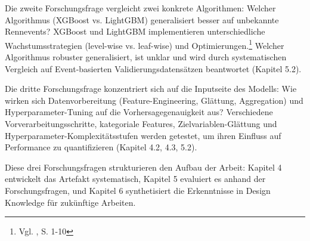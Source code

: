 Die zweite Forschungsfrage vergleicht zwei konkrete Algorithmen: Welcher Algorithmus (XGBoost vs. LightGBM) generalisiert besser auf unbekannte Rennevents? XGBoost und LightGBM implementieren unterschiedliche Wachstumsstrategien (level-wise vs. leaf-wise) und Optimierungen.\footnote{Vgl. \cite{Ke2017}, S. 1-10} Welcher Algorithmus robuster generalisiert, ist unklar und wird durch systematischen Vergleich auf Event-basierten Validierungsdatensätzen beantwortet (Kapitel 5.2).

Die dritte Forschungsfrage konzentriert sich auf die Inputseite des Modells: Wie wirken sich Datenvorbereitung (Feature-Engineering, Glättung, Aggregation) und Hyperparameter-Tuning auf die Vorhersagegenauigkeit aus? Verschiedene Vorverarbeitungsschritte, kategoriale Features, Zielvariablen-Glättung und Hyperparameter-Komplexitätsstufen werden getestet, um ihren Einfluss auf Performance zu quantifizieren (Kapitel 4.2, 4.3, 5.2).

Diese drei Forschungsfragen strukturieren den Aufbau der Arbeit: Kapitel 4 entwickelt das Artefakt systematisch, Kapitel 5 evaluiert es anhand der Forschungsfragen, und Kapitel 6 synthetisiert die Erkenntnisse in Design Knowledge für zukünftige Arbeiten.